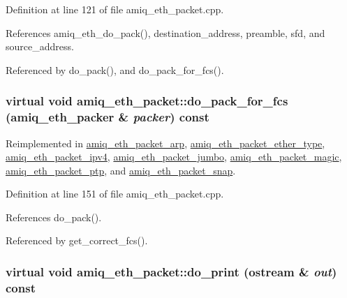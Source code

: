 Definition at line 121 of file amiq\_\-eth\_\-packet.cpp.

References amiq\_\-eth\_\-do\_\-pack(), destination\_\-address, preamble, sfd, and source\_\-address.

Referenced by do\_\-pack(), and do\_\-pack\_\-for\_\-fcs().\hypertarget{classamiq__eth__packet_aacbc675df31e2674b5b4c73c9bd9961e}{
\subsubsection[{do\_\-pack\_\-for\_\-fcs}]{\setlength{\rightskip}{0pt plus 5cm}virtual void amiq\_\-eth\_\-packet::do\_\-pack\_\-for\_\-fcs ({\bf amiq\_\-eth\_\-packer} \& {\em packer}) const}}
\label{classamiq__eth__packet_aacbc675df31e2674b5b4c73c9bd9961e}


Reimplemented in \hyperlink{classamiq__eth__packet__arp_aa94e012455f436aa874eb6e27e02b5fa}{amiq\_\-eth\_\-packet\_\-arp}, \hyperlink{classamiq__eth__packet__ether__type_aaa85cf778650e1c1b377392a975cb7bc}{amiq\_\-eth\_\-packet\_\-ether\_\-type}, \hyperlink{classamiq__eth__packet__ipv4_a9292f2b244e6baae39ba4aeea7b97e8f}{amiq\_\-eth\_\-packet\_\-ipv4}, \hyperlink{classamiq__eth__packet__jumbo_ad1b7057e4292645ccb65b57bcea3a549}{amiq\_\-eth\_\-packet\_\-jumbo}, \hyperlink{classamiq__eth__packet__magic_a0a40225ac5c36e70f413cd6d8ffd9a24}{amiq\_\-eth\_\-packet\_\-magic}, \hyperlink{classamiq__eth__packet__ptp_a68337ad7c7971f267b692dfbd92ede7b}{amiq\_\-eth\_\-packet\_\-ptp}, and \hyperlink{classamiq__eth__packet__snap_a042b049988a9e938cb80acb497cfafe5}{amiq\_\-eth\_\-packet\_\-snap}.

Definition at line 151 of file amiq\_\-eth\_\-packet.cpp.

References do\_\-pack().

Referenced by get\_\-correct\_\-fcs().\hypertarget{classamiq__eth__packet_aa179c700ae183f1b884a9222a73fed4e}{
\subsubsection[{do\_\-print}]{\setlength{\rightskip}{0pt plus 5cm}virtual void amiq\_\-eth\_\-packet::do\_\-print (ostream \& {\em out}) const}}
\label{classamiq__eth__packet_aa179c700ae183f1b884a9222a73fed4e}


